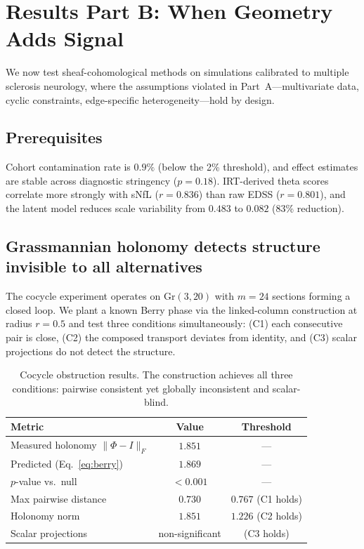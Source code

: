 \documentclass[11pt]{article}
\newcommand{\Gr}{\mathrm{Gr}}
\begin{document}
\section{Results Part B: When Geometry Adds Signal}
\label{sec:results-B}

We now test sheaf-cohomological methods on simulations calibrated to multiple sclerosis neurology, where the assumptions violated in Part~A---multivariate data, cyclic constraints, edge-specific heterogeneity---hold by design.

\subsection{Prerequisites}

Cohort contamination rate is $0.9\%$ (below the 2\% threshold), and effect estimates are stable across diagnostic stringency ($p = 0.18$).
IRT-derived theta scores correlate more strongly with sNfL ($r = 0.836$) than raw EDSS ($r = 0.801$), and the latent model reduces scale variability from $0.483$ to $0.082$ (83\% reduction).

\subsection{Grassmannian holonomy detects structure invisible to all alternatives}
\label{sec:res-cocycle}

The cocycle experiment operates on $\Gr(3, 20)$ with $m = 24$ sections forming a closed loop.
We plant a known Berry phase via the linked-column construction at radius $r = 0.5$ and test three conditions simultaneously: (C1) each consecutive pair is close, (C2) the composed transport deviates from identity, and (C3) scalar projections do not detect the structure.

\begin{table}[t]
\centering
\caption{Cocycle obstruction results. The construction achieves all three conditions: pairwise consistent yet globally inconsistent and scalar-blind.}
\label{tab:cocycle}
\small
\begin{tabular}{@{}lcc@{}}
\toprule
\textbf{Metric} & \textbf{Value} & \textbf{Threshold} \\
\midrule
Measured holonomy $\|\Phi - I\|_F$ & $1.851$ & --- \\
Predicted (Eq.~\ref{eq:berry}) & $1.869$ & --- \\
$p$-value vs.\ null & $< 0.001$ & --- \\
\midrule
Max pairwise distance & $0.730$ & $0.767$ (C1 holds) \\
Holonomy norm & $1.851$ & $1.226$ (C2 holds) \\
Scalar projections & non-significant & (C3 holds) \\
\bottomrule
\end{tabular}
\end{table}
\end{document}
